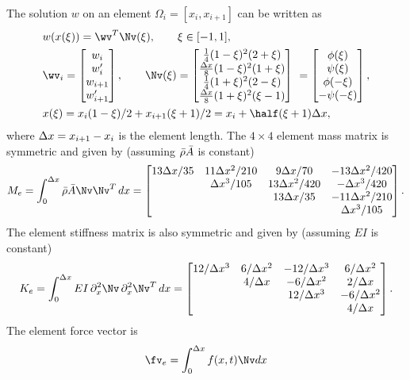 \documentclass[11pt]{article}
\begin{document}
The solution $w$ on an element $\Omega_i=[x_i,x_{i+1}]$ can be written as
\begin{align}
&  w(x(\xi)) =  \wv^T \Nv(\xi), \qquad \xi\in[-1,1], \\
&  \wv_i = \begin{bmatrix} 
               w_i \\  w'_i \\ w_{i+1} \\ w'_{i+1}
              \end{bmatrix},
\qquad 
\Nv(\xi) = \begin{bmatrix} 
               \frac{1}{4} (1-\xi)^2 (2+\xi) \\
               \frac{\dx}{8} (1-\xi)^2 (1+\xi) \\
               \frac{1}{4} (1+\xi)^2 (2-\xi) \\
               \frac{\dx}{8} (1+\xi)^2 (\xi-1) 
              \end{bmatrix}
  ~= \begin{bmatrix} \phi(\xi) \\ \psi(\xi) \\ \phi(-\xi) \\ -\psi(-\xi) \end{bmatrix}, \\
&  x(\xi) = x_i (1-\xi)/2 + x_{i+1}( \xi+1)/2 = x_i + \half(\xi+1)\dx , 
\end{align} 
where $\Delta x=x_{i+1}-x_i$ is the element length. 
% 
The $4\times 4$ element mass matrix is symmetric and given by (assuming $\bar{\rho}\bar{A}$ is constant)
\begin{align}
   M_e = \int_0^{\dx} \rhos \As \Nv \Nv^T \, dx = 
% 
\begin{bmatrix}
13\dx/35 & 11\dx^2/210 & 9\dx/70      & -13\dx^2/420 \\
         & \dx^3/105   & 13\dx^2/420  & -\dx^3/420   \\
         &             & 13\dx/35     & -11\dx^2/210 \\
         &             &              & \dx^3/105
\end{bmatrix}.
%
\end{align} 
The element stiffness matrix is also symmetric and given by  (assuming $EI$ is constant)
\begin{align}
   K_e = \int_0^{\dx} EI \, \partial_x^2\Nv \, \partial_x^2\Nv^T \, dx = 
\begin{bmatrix}
12/\dx^3 & 6/\dx^2 & -12/\dx^3 & 6/\dx^2 \\
         & 4/\dx   & -6/\dx^2  & 2/\dx   \\
         &         & 12/\dx^3  &-6/\dx^2 \\
         &         &           &4/\dx
\end{bmatrix}.
\end{align} 
% 
The element force vector is 
\begin{align}
 \fv_e = \int_0^{\dx} f(x,t) \Nv dx
\end{align} 
\end{document}
